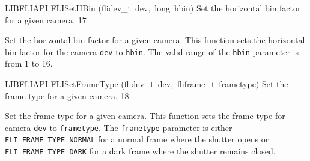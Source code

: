 \documentclass{article}
\begin{document}
\begin{cxxfunction}
{LIBFLIAPI}
        {FLISetHBin}
        {(flidev\_t\ dev,\ long\ hbin)}
        {
 Set the horizontal bin factor for a given camera.}
        {17}
\begin{cxxdoc}

Set the horizontal bin factor for a given camera.  This function
sets the horizontal bin factor for the camera \texttt{dev} to
\texttt{hbin}.  The valid range of the \texttt{hbin} parameter is
from 1 to 16.


\end{cxxdoc}
\end{cxxfunction}
\begin{cxxfunction}
{LIBFLIAPI}
        {FLISetFrameType}
        {(flidev\_t\ dev,\ fliframe\_t\ frametype)}
        {
 Set the frame type for a given camera.}
        {18}
\begin{cxxdoc}

Set the frame type for a given camera.  This function sets the frame type
for camera \texttt{dev} to \texttt{frametype}.  The \texttt{frametype}
parameter is either \texttt{FLI\_FRAME\_TYPE\_NORMAL} for a normal frame
where the shutter opens or \texttt{FLI\_FRAME\_TYPE\_DARK} for a dark frame
where the shutter remains closed.


\end{cxxdoc}
\end{cxxfunction}
\end{document}
